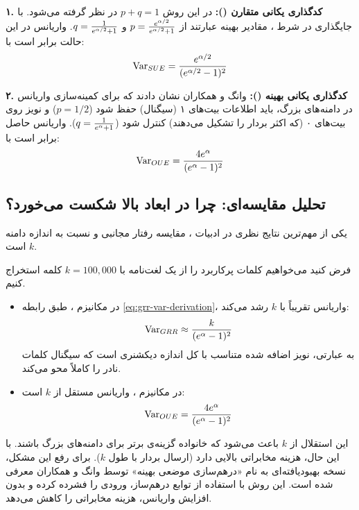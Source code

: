 \textbf{۱. کدگذاری یکانی متقارن ():}
در این روش $p+q=1$ در نظر گرفته می‌شود. با جایگذاری در شرط \LDP، مقادیر بهینه عبارتند از $p = \frac{e^{\alpha/2}}{e^{\alpha/2}+1}$ و $q = \frac{1}{e^{\alpha/2}+1}$. واریانس در این حالت برابر است با:
\begin{equation}
\mathrm{Var}_{SUE} = \frac{e^{\alpha/2}}{(e^{\alpha/2}-1)^2}
\end{equation}

\textbf{۲. کدگذاری یکانی بهینه ():}
وانگ و همکاران \cite{Wang2020} نشان دادند که برای کمینه‌سازی واریانس در دامنه‌های بزرگ، باید اطلاعات بیت‌های ۱ (سیگنال) حفظ شود ($p=1/2$) و نویز روی بیت‌های ۰ (که اکثر بردار را تشکیل می‌دهند) کنترل شود ($q = \frac{1}{e^{\alpha}+1}$).
واریانس حاصل برابر است با:
\begin{equation}
\mathrm{Var}_{OUE} = \frac{4e^{\alpha}}{(e^{\alpha}-1)^2}
\end{equation}

\subsection{تحلیل مقایسه‌ای: چرا  در ابعاد بالا شکست می‌خورد؟}
\label{sec:comparison-grr-oue}

یکی از مهم‌ترین نتایج نظری در ادبیات ، مقایسه رفتار مجانبی  و  نسبت به اندازه دامنه $k$ است.

\begin{مثال}
فرض کنید می‌خواهیم کلمات پرکاربرد را از یک لغت‌نامه با $k=100,000$ کلمه استخراج کنیم.
\begin{itemize}
    \item در مکانیزم ، طبق رابطه \eqref{eq:grr-var-derivation}، واریانس تقریباً با $k$ رشد می‌کند:
    \[ \mathrm{Var}_{GRR} \approx \frac{k}{(e^{\alpha}-1)^2} \]
    به عبارتی، نویز اضافه شده متناسب با کل اندازه دیکشنری است که سیگنال کلمات نادر را کاملاً محو می‌کند.
    
    \item در مکانیزم ، واریانس مستقل از $k$ است:
    \[ \mathrm{Var}_{OUE} = \frac{4e^{\alpha}}{(e^{\alpha}-1)^2} \]
\end{itemize}
این استقلال از $k$ باعث می‌شود که خانواده  گزینه‌ی برتر برای دامنه‌های بزرگ باشند. با این حال،  هزینه مخابراتی بالایی دارد (ارسال بردار با طول $k$). برای رفع این مشکل، نسخه بهبودیافته‌ای به نام «درهم‌سازی موضعی بهینه»  توسط وانگ و همکاران \cite{Wang2017} معرفی شده است. این روش با استفاده از توابع درهم‌ساز، ورودی را فشرده کرده و بدون افزایش واریانس، هزینه مخابراتی را کاهش می‌دهد.
\end{مثال}

